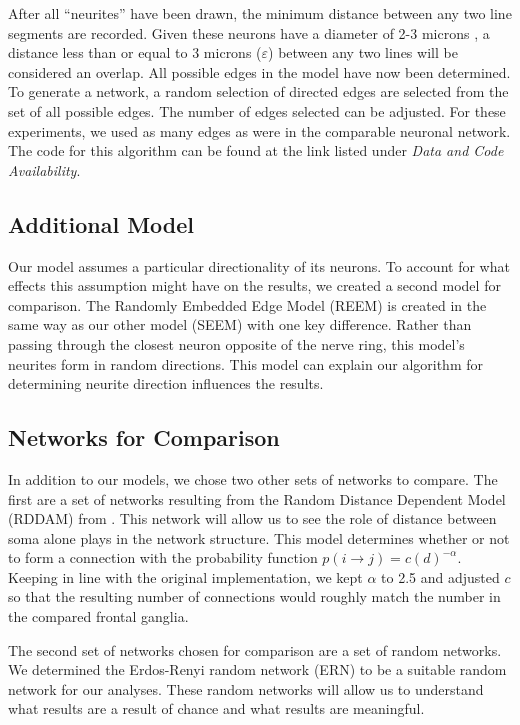 After all ``neurites'' have been drawn, the minimum distance between any two line segments are recorded. 
Given these neurons have a diameter of 2-3 microns \citep{Schafer}, a distance less than or equal to 3 microns ($\varepsilon$) between any two lines will be considered an overlap. 
All possible edges in the model have now been determined. 
To generate a network, a random selection of directed edges are selected from the set of all possible edges. 
The number of edges selected can be adjusted. 
For these experiments, we used as many edges as were in the comparable \ce neuronal network. 
The code for this algorithm can be found at the link listed under \textit{Data and Code Availability}.

\subsection{Additional Model}

Our model assumes a particular directionality of its neurons.
To account for what effects this assumption might have on the results, we created a second model for comparison. 
The Randomly Embedded Edge Model (REEM) is created in the same way as our other model (SEEM) with one key difference. 
Rather than passing through the closest neuron opposite of the nerve ring, this model's neurites form in random directions.
This model can explain our algorithm for determining neurite direction influences the results.

\subsection{Networks for Comparison}
In addition to our models, we chose two other sets of networks to compare. 
The first are a set of networks resulting from the Random Distance Dependent Model (RDDAM) from \cite{Itzhack}. 
This network will allow us to see the role of distance between soma alone plays in the network structure.
This model determines whether or not to form a connection with the probability function $p(i \rightarrow j)= c(d)^{- \alpha }$. 
Keeping in line with the original implementation, we kept $\alpha$ to 2.5 and adjusted $c$ so that the resulting number of connections would roughly match the number in the compared \ce frontal ganglia.

The second set of networks chosen for comparison are a set of random networks. 
We determined the Erdos-Renyi random network (ERN) to be a suitable random network for our analyses.
These random networks will allow us to understand what results are a result of chance and what results are meaningful.

